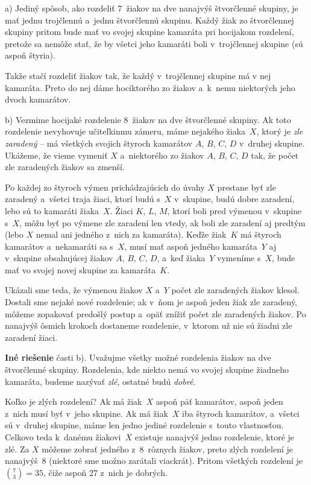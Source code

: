 {%
a) Jediný spôsob, ako rozdeliť 7~žiakov na dve nanajvýš štvorčlenné skupiny, je mať jednu trojčlennú a~jednu štvorčlennú skupinu.
Každý žiak zo štvorčlennej skupiny pritom bude mať vo svojej skupine kamaráta pri hocijakom rozdelení,
pretože sa nemôže stať, že by všetci jeho kamaráti boli v~trojčlennej skupine (sú aspoň štyria).

Takže stačí rozdeliť žiakov tak, že každý v~trojčlennej skupine má v nej kamaráta. Preto do nej dáme hociktorého zo žiakov
a~k~nemu niektorých jeho dvoch kamarátov.

\smallskip
b) Vezmime hocijaké rozdelenie 8~žiakov na dve štvorčlenné skupiny.
Ak toto rozdelenie nevyhovuje učiteľkinmu zámeru, máme nejakého žiaka~$X$,
ktorý je {\it zle zaradený\/} -- má všetkých svojich štyroch kamarátov $A$, $B$, $C$, $D$ v~druhej skupine.
Ukážeme, že vieme vymeniť $X$ a~niektorého zo žiakov $A$, $B$, $C$, $D$ tak,
že počet zle zaradených žiakov sa zmenší.

Po každej zo štyroch výmen prichádzajúcich do úvahy $X$ prestane byť zle zaradený
a~všetci traja žiaci, ktorí budú s~$X$ v~skupine, budú dobre zaradení, lebo sú to kamaráti žiaka~$X$.
Žiaci $K$, $L$, $M$, ktorí boli pred výmenou v~skupine s~$X$, môžu byť po výmene zle zaradení len vtedy,
ak boli zle zaradení aj predtým (lebo $X$ nemal ani jedného z~nich za kamaráta).
Keďže žiak~$K$ má štyroch kamarátov a~nekamaráti sa s~$X$, musí mať aspoň jedného kamaráta~$Y$
aj v~skupine obsahujúcej žiakov $A$, $B$, $C$, $D$, a~keď žiaka~$Y$ vymeníme s~$X$,
bude mať vo svojej novej skupine za kamaráta~$K$.

Ukázali sme teda, že výmenou žiakov $X$ a~$Y$ počet zle zaradených žiakov klesol.
Dostali sme nejaké nové rozdelenie; ak v~ňom je aspoň jeden žiak zle zaradený, môžeme zopakovať predošlý postup a~opäť
znížiť počet zle zaradených žiakov. Po nanajvýš ôsmich krokoch dostaneme rozdelenie, v~ktorom už nie sú žiadni zle zaradení žiaci.

\medskip\noindent
{\bf Iné riešenie} časti b).
Uvažujme všetky možné rozdelenia žiakov na dve štvorčlenné skupiny.
Rozdelenia, kde niekto nemá vo svojej skupine žiadneho kamaráta, budeme nazývať {\it zlé}, ostatné budú {\it dobré}.

Koľko je zlých rozdelení? Ak má žiak~$X$ aspoň päť kamarátov, aspoň jeden z~nich musí byť v~jeho skupine.
Ak má žiak~$X$ iba štyroch kamarátov, a~všetci sú v~druhej skupine, máme len jedno jediné rozdelenie s~touto vlastnosťou.
Celkovo teda k~danému žiakovi~$X$ existuje nanajvýš jedno rozdelenie, ktoré je zlé.
Za $X$ môžeme zobrať jedného z~8~rôznych žiakov, preto zlých rozdelení je nanajvýš~8 (niektoré sme možno zarátali viackrát).
Pritom všetkých rozdelení je ${7\choose 3}=35$, čiže aspoň 27 z~nich je dobrých.

}
